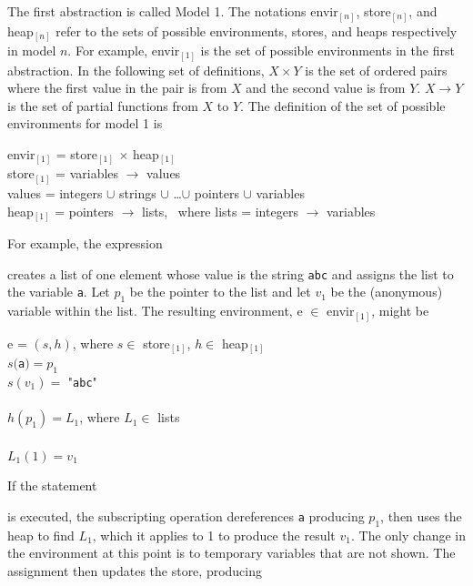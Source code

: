 The first abstraction is called Model 1. The notations envir$_{[n]}$,
store$_{[n]}$, and heap$_{[n]}$ refer to the sets of possible
environments, stores, and heaps respectively in model $n$. For
example, envir$_{[1]}$ is the set of possible environments in the
first abstraction. In the following set of definitions, $X \times Y$
is the set of ordered pairs where the first value in the pair is from
$X$ and the second value is from $Y$. $ X \rightarrow Y$ is the set of
partial functions from $X$ to $Y$. The definition of the set of
possible environments for model 1 is

\goodbreak
\begin{specialcode}{}
\>envir$_{[1]}$ = store$_{[1]}$ $\times$ heap$_{[1]}$\\
\>store$_{[1]}$ = variables $\rightarrow$ values\\
\>values       = integers $\cup$ strings $\cup$ \ldots $\cup$ pointers $\cup$ variables\\
\>heap$_{[1]}$  = pointers \textrm{${\rightarrow}$} lists,~%
                 where lists = integers $\rightarrow$ variables\\
\end{specialcode}


For example, the expression 


\noindent creates a list of one element whose value is the string \texttt{abc}
and assigns the list to the variable \texttt{a}. Let $p_1$ be the
pointer to the list and let $v_1$ be the (anonymous) variable within
the list. The resulting environment, e $\in$ envir$_{[1]}$, might be

\goodbreak
\begin{specialcode}{}
\>e = $(s,h)$, where $s \in $ store$_{[1]}$, $h \in $ heap$_{[1]}$\\
\>$s($\texttt{a}$) = p_1$\\
\>$s(v_1) = $ "\texttt{abc}"\\
\\
\>$h(p_1) = L_1$, where $L_1 \in$ lists\\
\\
\>$L_1(1) = v_1$\\
\end{specialcode}

\noindent
If the statement 



\noindent is executed, the subscripting operation dereferences \texttt{a}
producing $p_1$, then uses the heap to find $L_1$, which it applies to
1 to produce the result $v_1$. The only change in the environment at
this point is to temporary variables that are not shown. The
assignment then updates the store, producing

